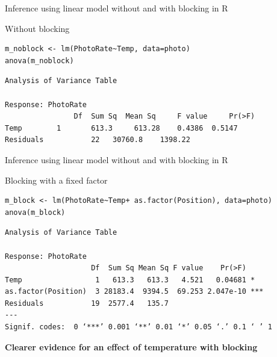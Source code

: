 \documentclass[10pt]{beamer}
\makeatletter
\newenvironment{kframe}{%
 \def\at@end@of@kframe{}%
 \ifinner\ifhmode%
  \def\at@end@of@kframe{\end{minipage}}%
  \begin{minipage}{\columnwidth}%
 \fi\fi%
 \def\FrameCommand##1{\hskip\@totalleftmargin \hskip-\fboxsep
 \colorbox{shadecolor}{##1}\hskip-\fboxsep
     \hskip-\linewidth \hskip-\@totalleftmargin \hskip\columnwidth}%
 \MakeFramed {\advance\hsize-\width
   \@totalleftmargin\z@ \linewidth\hsize
   \@setminipage}}%
 {\par\unskip\endMakeFramed%
 \at@end@of@kframe}
\newenvironment{knitrout}{}{} %
\makeatother
\begin{document}
\begin{frame}[fragile]{Inference using linear model without and with blocking in R}
 
 Without blocking
  \begin{knitrout}
\color{fgcolor}\begin{kframe}
\begin{verbatim}
m_noblock <- lm(PhotoRate~Temp, data=photo)
anova(m_noblock)
\end{verbatim}
\end{kframe}
\end{knitrout}

\begin{knitrout}
\color{fgcolor}\begin{kframe}
\begin{verbatim}
Analysis of Variance Table
 
Response: PhotoRate
          		Df  Sum Sq 	Mean Sq 	F value 	Pr(>F)
Temp      	1       613.3  	  613.28  	0.4386 	0.5147
Residuals           22   30760.8 	1398.22
\end{verbatim}
\end{kframe}
\end{knitrout}
 
\end{frame}


\begin{frame}[fragile]{Inference using linear model without and with blocking in R}
 
 Blocking with a fixed factor
  \begin{knitrout}
\color{fgcolor}\begin{kframe}
\begin{verbatim}
m_block <- lm(PhotoRate~Temp+ as.factor(Position), data=photo)
anova(m_block)
\end{verbatim}
\end{kframe}
\end{knitrout}

\begin{knitrout}
\color{fgcolor}\begin{kframe}
\begin{verbatim}
Analysis of Variance Table

Response: PhotoRate
                    Df  Sum Sq Mean Sq F value    Pr(>F)    
Temp                 1   613.3   613.3   4.521   0.04681 *  
as.factor(Position)  3 28183.4  9394.5  69.253 2.047e-10 ***
Residuals           19  2577.4   135.7                      
---
Signif. codes:  0 ‘***’ 0.001 ‘**’ 0.01 ‘*’ 0.05 ‘.’ 0.1 ‘ ’ 1
\end{verbatim}
\end{kframe}
\end{knitrout}
 
 \textbf{Clearer evidence for an effect of temperature with blocking}
 
\end{frame}
\end{document}
